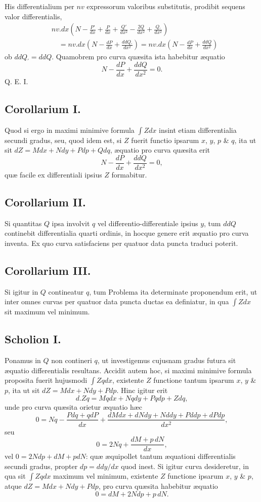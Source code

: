 His differentialium per $nv$ expressorum valoribus substitutis, prodibit sequens valor differentialis,
\[
\begin{aligned}
&nv.dx\left(N-\frac{P'}{dx}+\frac{P}{dx}+\frac{Q'}{dx^2}-\frac{2Q}{dx^2}+\frac{Q_{\prime}}{dx^2}\right)\\
&\quad=nv.dx\left(N-\frac{dP}{dx}+\frac{ddQ_{\prime}}{dx^2}\right)
=nv.dx\left(N-\frac{dP}{dx}+\frac{ddQ}{dx^2}\right)
\end{aligned}
\]
ob $ddQ_{\prime}=ddQ$. Quamobrem pro curva quæsita ista habebitur æquatio
\[N-\frac{dP}{dx}+\frac{ddQ}{dx^2}=0.\]
Q. E. I.

\subsection*{Corollarium I.}
Quod si ergo in maximi minimive formula $\int Zdx$ insint etiam differentialia secundi gradus, seu, quod idem est, si $Z$ fuerit functio ipsarum $x$, $y$, $p$ \& $q$, ita ut sit $dZ=Mdx+Ndy+Pdp+Qdq$, æquatio pro curva quæsita erit
\[
N-\frac{dP}{dx}+\frac{ddQ}{dx^2}=0,
\]
quæ facile ex differentiali ipsius $Z$ formabitur.

\subsection*{Corollarium II.}
Si quantitas $Q$ ipsa involvit $q$ vel differentio-differentiale ipsius $y$, tum $ddQ$ continebit differentialia quarti ordinis, in hocque genere erit æquatio pro curva inventa. Ex quo curva satisfaciens per quatuor data puncta traduci poterit.

\subsection*{Corollarium III.}
Si igitur in $Q$ contineatur $q$, tum Problema ita determinate proponendum erit, ut inter omnes curvas per quatuor data puncta ductas ea definiatur, in qua $\int Zdx$ sit maximum vel minimum.

\subsection*{Scholion I.}
Ponamus in $Q$ non contineri $q$, ut investigemus cujusnam gradus futura sit æquatio differentialis resultans. Accidit autem hoc, si maximi minimive formula proposita fuerit hujusmodi $\int Zqdx$, existente $Z$ functione tantum ipsarum $x$, $y$ \& $p$, ita ut sit $dZ=Mdx+Ndy+Pdp$. Hinc igitur erit
\[
d.Zq=Mqdx+Nqdy+Pqdp+Zdq,
\]
unde pro curva quæsita orietur æquatio hæc
\[
0=Nq-\frac{Pdq+qdP}{dx}
 +\frac{dMdx+dNdy+Nddy+Pddp+dPdp}{dx^2},
\]
seu
\[
0=2Nq+\frac{dM+p\,dN}{dx},
\]
vel $0=2Ndp+dM+pdN$: quæ æquipollet tantum æquationi differentialis secundi gradus, propter $dp=ddy/dx$ quod inest. Si igitur curva desideretur, in qua sit $\int Zqdx$ maximum vel minimum, existente $Z$ functione ipsarum $x$, $y$ \& $p$, atque $dZ=Mdx+Ndy+Pdp$, pro curva quæsita habebitur æquatio
\[
0=dM+2Ndp+p\,dN.
\]

